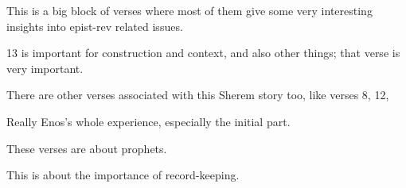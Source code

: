 \begin{compactdesc}
				\begin{compactitem}
					\item This is a big block of verses where most of them give some very interesting insights into epist-rev related issues. 
					\item 13 is important for construction and context, and also other things; that verse is very important.
				\end{compactitem}
			\item[{\hyperref[JACOB-6-8]{Jacob 6:8}}]
			\item[{\hyperref[JACOB-7-5]{Jacob 7:5}}] \phantom{.}
				\begin{compactitem}
					\item There are other verses associated with this Sherem story too, like verses 8, 12, 
				\end{compactitem}
			\item[{\hyperref[ENOS-1-2]{Enos 1:2--11}}] \phantom{.}
				\begin{compactitem}
					\item Really Enos's whole experience, especially the initial part.
				\end{compactitem}
			\item[{\hyperref[JAROM-1-4]{Jarom 1:4}}]
			\item[{\hyperref[OMNI-1-20]{Omni 1:20}}]
			\item[{\hyperref[OMNI-1-25]{Omni 1:25}}]
			\item[{\hyperref[WORDSOFMORMON-1-7]{Words of Mormon 1:7--9}}]
			\item[{\hyperref[WORDSOFMORMON-1-16]{Words of Mormon 1:16--18}}] \phantom{.}
				\begin{compactitem}
					\item These verses are about prophets.
				\end{compactitem}
			\item[{\hyperref[MOSIAH-1-3]{Mosiah 1:3--5}}] \phantom{.}
				\begin{compactitem}
					\item This is about the importance of record-keeping.
				\end{compactitem}
			\item[{\hyperref[MOSIAH-2-9]{Mosiah 2:9}}]
			\item[{\hyperref[MOSIAH-2-33]{Mosiah 2:33}}]
			\item[{\hyperref[MOSIAH-2-36]{Mosiah 2:36--37}}]
			\item[{\hyperref[MOSIAH-3-2]{Mosiah 3:2}}] \phantom{.}
				\begin{compactitem}

\end{compactitem}
\end{compactdesc}

